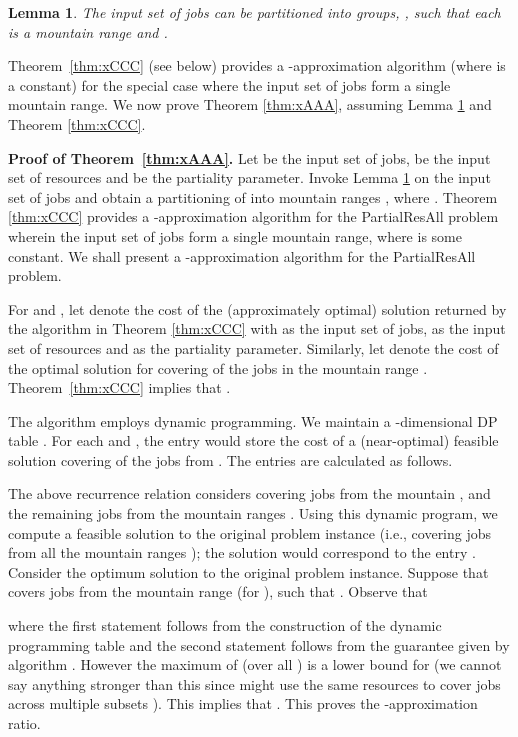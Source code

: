 \documentclass[11pt]{article}
\newtheorem{lemma}[theorem]{Lemma}
\newcommand{\PResAll}{{\sc PartialResAll}}
\begin{document}
\begin{lemma}
\label{lem:XXX}
The input set of jobs can be partitioned into groups, , such that 
each  is a mountain range and .
\end{lemma}

Theorem~\ref{thm:xCCC} (see below) provides a -approximation algorithm (where  is a constant) for the special
case where the input set of jobs form a single mountain range. 
We now prove Theorem \ref{thm:xAAA}, assuming Lemma \ref{lem:XXX} and Theorem \ref{thm:xCCC}. 

\par\noindent
{\bf Proof of Theorem~\ref{thm:xAAA}.}
Let  be the input set of jobs,  be the input set of resources and  be the partiality parameter.
Invoke Lemma \ref{lem:XXX} on the input set of jobs  and obtain a partitioning of 
into mountain ranges , where .
Theorem \ref{thm:xCCC} provides a -approximation algorithm  for the {\PResAll} problem wherein
the input set of jobs form a single mountain range, where  is some constant.
We shall present a -approximation algorithm for the {\PResAll} problem.

For  and , let  denote the 
cost of the (approximately optimal) solution returned by the algorithm in Theorem \ref{thm:xCCC}
with  as the input set of jobs,  as the input set of resources and 
as the partiality parameter.
Similarly, let  denote the cost of the optimal solution for covering  of the jobs in the 
mountain range . Theorem~\ref{thm:xCCC} implies that .

The algorithm employs dynamic programming. 
We maintain a -dimensional DP table . 
For each  and ,
the entry  would 
store the cost of a (near-optimal) feasible solution
covering  of the jobs from .
The entries are calculated as follows.


The above recurrence relation considers covering  jobs from the mountain , 
and the remaining   jobs from the mountain ranges .
Using this dynamic program, we compute a feasible solution to the original problem instance 
(i.e., covering  jobs from all the mountain ranges );
the solution would correspond to the entry .
Consider the optimum solution  to the original problem instance. 
Suppose that  covers  jobs from the mountain range  (for ), 
such that . 
Observe that 

where the first statement follows from the construction of the dynamic programming table
and the second statement follows from the guarantee given by algorithm .
However the maximum of  (over all ) is a lower bound for 
(we cannot say anything stronger than this since  might 
use the same resources to cover jobs across multiple subsets ). 
This implies that . This proves
the -approximation ratio. 
\end{document}
